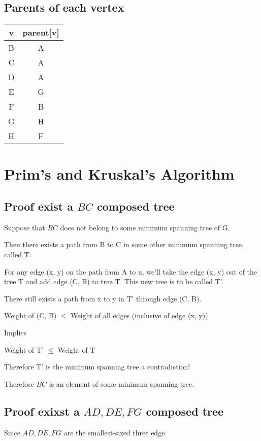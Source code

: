 \documentclass[a4paper]{article}
\begin{document}
\subsection{Parents of each vertex}
\begin{center}
  \begin{tabular}{ |c|c| }
    \hline
    v & parent[v] \\ \hline
    B & A \\
    C & A \\
    D & A \\
    E & G \\
    F & B \\
    G & H \\
    H & F \\
    \hline
  \end{tabular}
\end{center}

\section{Prim's and Kruskal's Algorithm}

\subsection{Proof exist a $BC$ composed tree}

Suppose that $BC$ does not belong to some minimum spanning tree of G.

Then there exists a path from B to C in some other minimum spanning tree, called T.

For any edge (x, y) on the path from A to u, we’ll take the edge (x, y) out of the tree T and add edge (C, B) to tree T. This new tree is to be called T’.

There still exists a path from x to y in T’ through edge (C, B).

Weight of (C, B) $\leq$ Weight of all edges (inclusive of edge (x, y))

Implies

Weight of T’ $\leq$ Weight of T

Therefore T’ is the minimum spanning tree a contradiction!

Therefore $BC$ is an element of some minimum spanning tree.

\subsection{Proof exixst a $AD,DE,FG$ composed tree}
Since $AD,DE,FG$ are the smallest-sized three edge.
\end{document}
